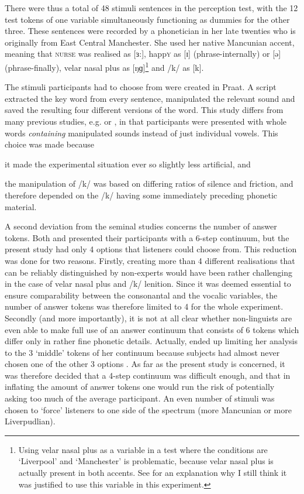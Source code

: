 There were thus a total of 48 stimuli sentences in the perception test, with the 12 test tokens of one variable simultaneously functioning as dummies for the other three.
These sentences were recorded by a phonetician in her late twenties who is originally from East Central Manchester.
She used her native Mancunian accent, meaning that \textsc{nurse} was realised as [ɜ:], happ\textsc{y} as [ɪ] (phrase-internally) or [ə] (phrase-finally), velar nasal plus as [ŋɡ]\footnote{Using velar nasal plus as a variable in a  test where the conditions are `Liverpool' and `Manchester' is problematic, because velar nasal plus is actually present in both accents. See  for an explanation why I still think it was justified to use this variable in this  experiment.} and /k/ as [k].

The stimuli participants had to choose from were created in Praat.
A script extracted the key word from every sentence, manipulated the relevant sound and saved the resulting four different versions of the word.
This study differs from many previous studies, e.g. \citealt{hayetal2006a} or \citealt{niedzielski1999}, in that participants were presented with whole words \emph{containing} manipulated sounds instead of just individual vowels.
This choice was made because
\begin{inparaenum}[(a)]
	\item it made the experimental situation ever so slightly less artificial, and
	\item the manipulation of /k/ was based on differing ratios of silence and friction, and therefore depended on the /k/ having some immediately preceding phonetic material.
\end{inparaenum}
A second deviation from the seminal studies concerns the number of answer tokens.
Both \citeauthor{niedzielski1999} and \citeauthor{hayetal2006a} presented their participants with a 6-step continuum, but the present study had only 4 options that listeners could choose from.
This reduction was done for two reasons.
Firstly, creating more than 4 different realisations that can be reliably distinguished by non-experts would have been rather challenging in the case of velar nasal plus and /k/ lenition.
Since it was deemed essential to ensure comparability between the consonantal and the vocalic variables, the number of answer tokens was therefore limited to 4 for the whole experiment.
Secondly (and more importantly), it is not at all clear whether non-linguists are even able to make full use of an answer continuum that consists of 6 tokens which differ only in rather fine phonetic details.
Actually, \citealt{niedzielski1999} ended up limiting her analysis to the 3 `middle' tokens of her continuum because subjects had almost never chosen one of the other 3 options \parencite[cf.][64--65]{niedzielski1999}.
As far as the present study is concerned, it was therefore decided that a 4-step continuum was difficult enough, and that in inflating the amount of answer tokens one would run the risk of potentially asking too much of the average participant.
An even number of stimuli was chosen to `force' listeners to one side of the spectrum (more Mancunian or more Liverpudlian).

